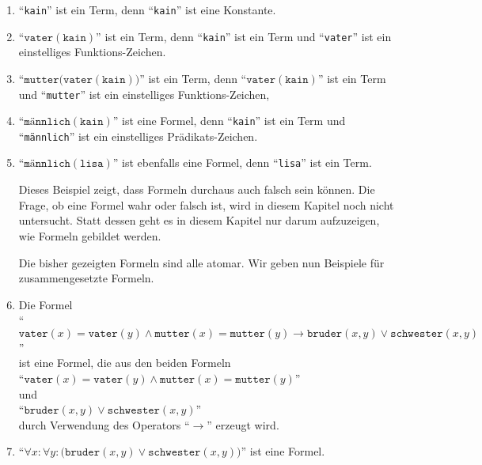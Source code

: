 \begin{enumerate}
\item ``\texttt{kain}'' ist ein Term, denn ``\texttt{kain}'' ist eine Konstante.
\item ``$\mathtt{vater}(\mathtt{kain})$'' ist ein Term, denn ``\texttt{kain}''
      ist ein Term und ``\texttt{vater}'' ist ein einstelliges Funktions-Zeichen.
\item ``$\mathtt{mutter}\bigl(\mathtt{vater}(\mathtt{kain})\bigr)$'' ist ein Term, denn ``$\mathtt{vater}(\mathtt{kain})$'' ist
      ein Term und ``\texttt{mutter}'' ist ein einstelliges Funktions-Zeichen,
\item ``$\texttt{m\"annlich}(\mathtt{kain})$'' ist eine Formel, denn
      ``\texttt{kain}'' ist ein Term und
      ``\texttt{m\"annlich}'' ist ein einstelliges Pr\"adikats-Zeichen.
\item ``$\texttt{m\"annlich}(\mathtt{lisa})$'' ist ebenfalls eine Formel, denn
      ``\texttt{lisa}'' ist ein Term. 

      Dieses Beispiel zeigt, dass Formeln durchaus auch falsch sein k\"onnen.  Die Frage, ob eine
      Formel wahr oder falsch ist, wird in diesem Kapitel noch nicht untersucht.  Statt dessen geht
      es in diesem Kapitel nur darum aufzuzeigen, wie Formeln gebildet werden.

      Die bisher gezeigten Formeln sind alle atomar.  Wir geben nun Beispiele f\"ur zusammengesetzte 
      Formeln.
\item Die Formel
      \\[0.2cm]
      \hspace*{1.3cm}
      ``$\mathtt{vater}(x) = \mathtt{vater}(y) \wedge \mathtt{mutter}(x) = \mathtt{mutter}(y)
         \rightarrow       \mathtt{bruder}(x,y) \vee \mathtt{schwester}(x,y)$''
      \\[0.2cm]
      ist eine Formel, die aus den beiden Formeln \\[0.2cm]
      \hspace*{1.3cm}  ``$\mathtt{vater}(x) = \mathtt{vater}(y) \wedge \mathtt{mutter}(x) =
      \mathtt{mutter}(y)$'' \quad 
      \\[0.0cm]
      und 
      \\[0.0cm]
      \hspace*{1.3cm}  ``$\mathtt{bruder}(x,y) \vee \mathtt{schwester}(x,y)$'' \\[0.2cm]
      durch Verwendung des Operators ``$\rightarrow$'' erzeugt wird.  
\item ``$\forall x\colon \forall y\colon \bigl(\mathtt{bruder}(x,y) \vee \mathtt{schwester}(x,y)\bigr)$''   ist eine Formel.
\end{enumerate}
